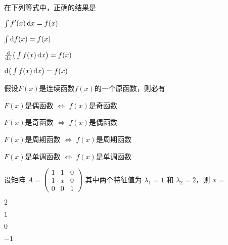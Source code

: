 \documentclass{jnuexam}
\begin{document}
\renewcommand{\niandu}{2020--2021}
\renewcommand{\xueqi}{1}
\renewcommand{\kecheng}{第一章~~有理数}
\renewcommand{\zhuanye}{ } %
\renewcommand{\jiaoshi}{李毅} %
\renewcommand{\shijian}{2020~年~10~月~01~日}
\renewcommand{\bixiu}{1} %
\renewcommand{\bijuan}{1} %
\renewcommand{\shijuan}{A} %
\renewcommand{\neizhao}{1} %
\renewcommand{\waizhao}{0} %

\makehead %



\newpageb %

\begin{problem}
在下列等式中，正确的结果是
\begin{abcd}
  \item $\int f'(x)\mathop{}\!\mathrm{d} x=f(x)$
  \item $\int \d f(x)=f(x)$
  \item $\frac{\d}{\dx}\big(\int f(x)\dx\big)=f(x)$
  \item $\d\big(\int f(x)\dx\big)=f(x)$
\end{abcd}
\end{problem}

\bigskip

\begin{problem}
假设$F(x)$是连续函数$f(x)$的一个原函数，则必有
\begin{abcd}
  \item $F(x)$是偶函数 $\Leftrightarrow$ $f(x)$是奇函数
  \item $F(x)$是奇函数 $\Leftrightarrow$ $f(x)$是偶函数
  \item $F(x)$是周期函数 $\Leftrightarrow$ $f(x)$是周期函数
  \item $F(x)$是单调函数 $\Leftrightarrow$ $f(x)$是单调函数
\end{abcd}
\end{problem}

\bigskip

\begin{problem}
设矩阵 $A = \left(\begin{array}{ccc}
      1 & 1 & 0 \\
      1 & x & 0 \\
      0 & 0 & 1
    \end{array}\right)$ 其中两个特征值为 $\lambda_1 = 1$ 和 $\lambda_2
  = 2$，则 $x=$ 
\begin{abcd}
  \item $2$
  \item $1$
  \item $0$
  \item $-1$
\end{abcd}
\end{problem}
\end{document}
